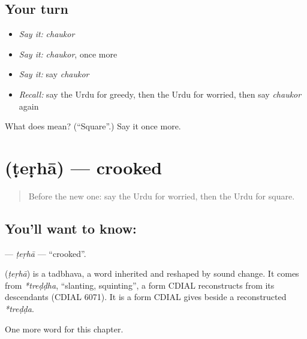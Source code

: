 \subsection*{Your turn}
\begin{itemize}
\raggedright
  \item \emph{Say it:} \emph{chaukor}
  \item \emph{Say it:} \emph{chaukor}, once more
  \item \emph{Say it:} say \emph{chaukor}
  \item \emph{Recall:} say the Urdu for greedy, then the Urdu for worried, then say \emph{chaukor} again
\end{itemize}

\begin{tcolorbox}[breakable,colback=teal!4,colframe=teal!35!black,title={Before you move on}]
What does  mean? (\textquotedblleft{}Square\textquotedblright{}.) Say it once more.
\end{tcolorbox}
\section[\texorpdfstring{\ur{ٹیڑھا} (ṭeṛhā)}{ٹیڑھا (ṭeṛhā)}]{ (ṭeṛhā) — crooked}

\label{lesson:UR-C194-terha}



\begin{quote}
Before the new one: say the Urdu for worried, then the Urdu for square.
\end{quote}

\subsection*{You'll want to know: }
\textbf{} — \emph{ṭeṛhā} — \textquotedblleft{}crooked\textquotedblright{}.

\begin{cousinweb}
\textbf{} (\emph{ṭeṛhā}) is a tadbhava, a word inherited and reshaped by sound change. It comes from \emph{*treḍḍha}, \textquotedblleft{}slanting, squinting\textquotedblright{}, a form CDIAL reconstructs from its descendants (CDIAL 6071). It is a form CDIAL gives beside a reconstructed \emph{*treḍḍa}.
\end{cousinweb}

\begin{grammarlens}[title={What you've built}]
One more word for this chapter.
\end{grammarlens}

